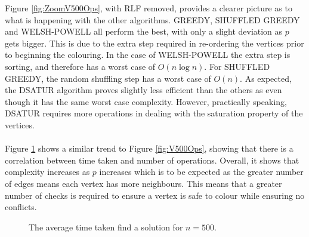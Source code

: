 Figure \ref{fig:ZoomV500Ops}, with RLF removed, provides a clearer picture as to what is happening with the other algorithms. GREEDY, SHUFFLED GREEDY and WELSH-POWELL all perform the best, with only a slight deviation as $p$ gets bigger. This is due to the extra step required in re-ordering the vertices prior to beginning the colouring. In the case of WELSH-POWELL the extra step is sorting, and therefore has a worst case of $O(n \log n)$. For SHUFFLED GREEDY, the random shuffling step has a worst case of $O(n)$. As expected, the DSATUR algorithm proves slightly less efficient than the others as even though it has the same worst case complexity. However, practically speaking, DSATUR requires more operations in dealing with the saturation property of the vertices. 
\\\\
Figure \ref{fig:V500Time} shows a similar trend to Figure \ref{fig:V500Ops}, showing that there is a correlation between time taken and number of operations. Overall, it shows that complexity increases as $p$ increases which is to be expected as the greater number of edges means each vertex has more neighbours. This means that a greater number of checks is required to ensure a vertex is safe to colour while ensuring no conflicts. 

\begin{figure}[H]
    \centering

  \caption{The average time taken find a solution for $n = 500$.}
    \label{fig:V500Time}
\end{figure}  

